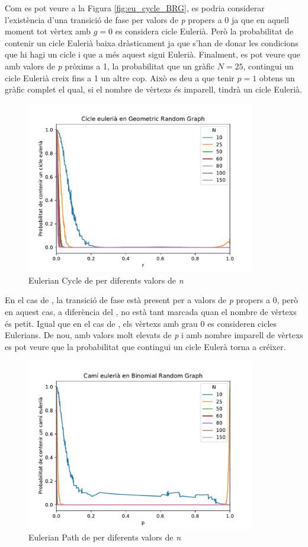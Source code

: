 Com es pot veure a la Figura \ref{fig:eu_cycle_BRG}, es podria considerar l'existència d'una transició de fase per valors de \textit{p} propers a 0 ja que en aquell moment tot vèrtex amb $g=0$ es considera cicle Eulerià. Però la probabilitat de contenir un cicle Eulerià baixa dràsticament ja que s'han de donar les condicions que hi hagi un cicle i que a més aquest sigui Eulerià. Finalment, es pot veure que amb valors de \textit{p} pròxims a 1, la probabilitat que un gràfic $N=25$, contingui un cicle Eulerià creix fins a 1 un altre cop. Això es deu a que tenir $p=1$ obtens un gràfic complet el qual, si el nombre de vèrtexs és imparell, tindrà un cicle Eulerià.

\begin{figure}[H]
    \centering
    \includegraphics[width=10cm]{plots/GRG_eulerianCycle.pdf}
    \caption{Eulerian Cycle de \RGG per diferents valors de \textit{n}}
    \label{fig:eu_cycle_RGG}
\end{figure}

En el cas de \RGG, la transició de fase està present per a valors de \textit{p} propers a 0, però en aquest cas, a diferència del \BRG, no està tant marcada quan el nombre de vèrtexs és petit. Igual que en el cas de \BRG, els vèrtexs amb grau 0 es consideren cicles Eulerians. De nou, amb valors molt elevats de \textit{p} i amb nombre imparell de vèrtexs es pot veure que la probabilitat que contingui un cicle Eulerà torna a créixer. %

\begin{figure}[H]
    \centering
    \includegraphics[width=10cm]{plots/BRG_eulerianPath.pdf}
    \caption{Eulerian Path de \BRG per diferents valors de \textit{n}}
    \label{fig:eu_path_BRG}
\end{figure}

